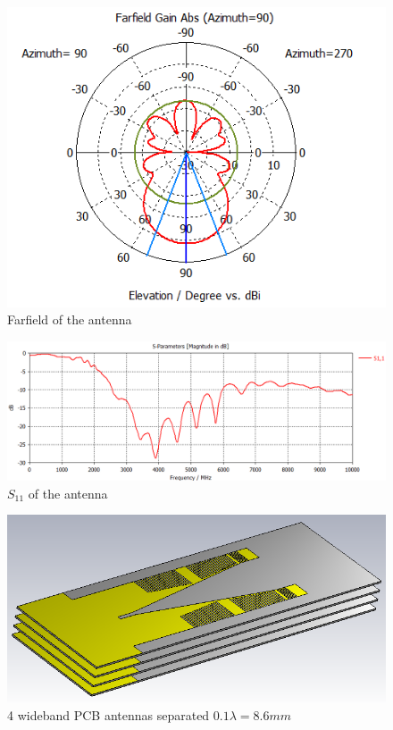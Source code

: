 \begin{figure}[H]
\centering 
\includegraphics[scale = 0.7]{figures/measurement/antenna_ff.png}
\caption{Farfield of the antenna}
\label{fig:ant_ff}
\end{figure} 


\begin{figure}[H]
\centering 
\includegraphics[scale = 0.6]{figures/measurement/antenna_spar.png}
\caption{$S_{11}$ of the antenna}
\label{fig:ant_spar}
\end{figure} 

\begin{figure}[H]
\centering 
\includegraphics[scale = 0.7]{figures/measurement/antenna_array.png}
\caption{4 wideband PCB antennas separated $0.1\lambda = 8.6mm$ }
\label{fig:ant_array}
\end{figure}

